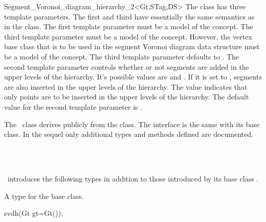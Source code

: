 \begin{ccRefClass}{Segment_Voronoi_diagram_hierarchy_2<Gt,STag,DS>}
The class has three template parameters. The first and third
have essentially the same semantics as in the
 class. The
first template parameter must be a model of the
 concept. The third template
parameter must be a model of the
 concept. However, the
vertex base class that is to be used in the segment Voronoi diagram
data structure must be a model of the
concept. The third template parameter defaults to
. The second template
parameter controls whether or not segments are added in the upper
levels of the hierarchy. It's possible values are 
and . If it is set to ,
segments are also inserted in the upper levels of the hierarchy. The
value  indicates that only points are to be
inserted in the upper levels of the hierarchy. The default value for
the second template parameter is .


The \ccRefName\ class derives publicly from the
 class. The interface is
the same with its base class. In the sequel only additional types
and methods defined are documented.




\ccIsModel
{}\\
\\

\ccInheritsFrom
{}


\ccTypes
\ccRefName\ introduces the following types in addition to those
introduced by its base class
.

\ccThreeToTwo
{}
\ccGlue
{}
          {A type for the base class.}

\ccCreation
{}
%
{svdh(Gt gt=Gt());}{}
\ccThreeToTwo
{}


\end{ccRefClass}
